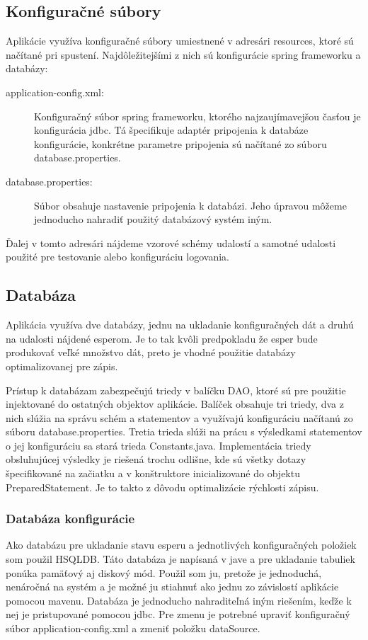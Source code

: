 	\subsection{Konfiguračné súbory}
		Aplikácie využíva konfiguračné súbory umiestnené v adresári resources, ktoré sú načítané pri spustení. Najdôležitejšími z nich sú konfigurácie spring frameworku a databázy:
		\begin{description}
			\item[application-config.xml:] Konfiguračný súbor spring frameworku, ktorého najzaujímavejšou časťou je konfigurácia jdbc. Tá špecifikuje adaptér pripojenia k databáze konfigurácie, konkrétne parametre pripojenia sú načítané zo súboru database.properties.
			\item[database.properties:] Súbor obsahuje nastavenie pripojenia k databázi. Jeho úpravou môžeme jednoducho nahradiť použitý databázový systém iným.
		\end{description}
		Ďalej v tomto adresári nájdeme vzorové schémy udalostí a samotné udalosti použité pre testovanie alebo konfiguráciu logovania.
	
	\subsection{Databáza}
		Aplikácia využíva dve databázy, jednu na ukladanie konfiguračných dát a druhú na udalosti nájdené esperom. Je to tak kvôli predpokladu že esper bude produkovať veľké množstvo dát, preto je vhodné použitie databázy optimalizovanej pre zápis.
		
		Prístup k databázam zabezpečujú triedy v balíčku DAO, ktoré sú pre použitie injektované do ostatných objektov aplikácie. Balíček obsahuje tri triedy, dva z nich slúžia na správu schém a statementov a využívajú konfiguráciu načítanú zo súboru database.properties. Tretia trieda slúži na prácu s výsledkami statementov o jej konfiguráciu sa stará trieda Constants.java. Implementácia triedy obsluhujúcej výsledky je riešená trochu odlišne, kde sú všetky dotazy špecifikované na začiatku a v konštruktore inicializované do objektu PreparedStatement. Je to takto z dôvodu optimalizácie rýchlosti zápisu.			
	
		\subsubsection{Databáza konfigurácie}
		Ako databázu pre ukladanie stavu esperu a jednotlivých konfiguračných položiek som použil \ac{HSQLDB}. Táto databáza je napísaná v jave a pre ukladanie tabuliek ponúka pamäťový aj diskový mód. Použil som ju, pretože je jednoduchá, nenáročná na systém a je možné ju stiahnuť ako jednu zo závislostí aplikácie pomocou mavenu. Databáza je jednoducho nahraditeľná iným riešením, keďže k nej je pristupované pomocou jdbc. Pre zmenu je potrebné upraviť konfiguračný súbor application-config.xml a zmeniť položku dataSource.
		
